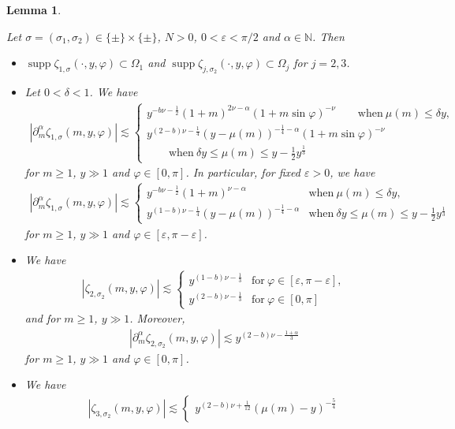 \documentclass[pdftex]{sigma}
\numberwithin{equation}{section}
\newtheorem{Lemma}[Theorem]{Lemma}
\def\d{\,\mathrm{d}}%
\DeclareMathOperator{\supp}{supp}%
\def\a{\alpha}
\def\d{\delta}
\def\e{\varepsilon}
\def\f{\varphi}
\def\m{\mu}
\def\n{\nu}
\def\s{\sigma}
\def\z{\zeta}
\def\pa{\partial}
\begin{document}
\begin{Lemma}\label{ampesti}

Let $\s=(\s_1,\s_2)\in \{\pm\}\times\{\pm\}$, $N>0$, $0<\e<\pi/2$ and $\a\in\mathbb{N}$. Then
\begin{itemize}\itemsep=0pt
\item[$(i)$] $\supp \z_{1,\s}(\cdot,y,\f)\subset \Omega_1$ and $\supp \z_{j,\s_2}(\cdot,y,\f)\subset \Omega_j$ for $j=2,3$.
\item[$(ii)$] Let $0<\d<1$. We have
\begin{align*}
|\pa_{m}^{\a}\z_{1,\s}(m,y,\f)|\lesssim \begin{cases}y^{-b\n-\frac{1}{2}}(1+m)^{2\n-\a}(1+m\sin \f)^{-\n} \qquad \text{when}\  \m(m)\leq \d y, \\
y^{(2-b)\n-\frac{1}{4}} (y-\m(m))^{-\frac{1}{4}-\a}(1+m\sin \f)^{-\n}\\
\qquad\text{when}\  \d y\leq \m(m)\leq y-\frac{1}{2}y^{\frac{1}{3}}
\end{cases}
\end{align*}
for $m\geq 1$, $y\gg 1$ and $\f\in [0,\pi]$. In particular, for fixed $\e>0$, we have
\begin{align*}
|\pa_{m}^{\a}\z_{1,\s}(m,y,\f)|\lesssim \begin{cases}y^{-b\n-\frac{1}{2}}(1+m)^{\n-\a}&  \text{when}\  \m(m)\leq \d y,\\
y^{(1-b)\n-\frac{1}{4}} (y-\m(m))^{-\frac{1}{4}-\a}& \text{when}\  \d y\leq \m(m)\leq y-\frac{1}{2}y^{\frac{1}{3}}
\end{cases}
\end{align*}
for $m\geq 1$, $y\gg 1$ and $\f\in [\e,\pi-\e]$.
\item[$(iii)$] We have
\begin{align*}
|\z_{2,\s_2}(m,y,\f)|\lesssim \begin{cases}y^{(1-b)\n-\frac{1}{3}}& \text{for}\  \f\in [\e,\pi-\e],\\
y^{(2-b)\n-\frac{1}{3}}& \text{for}\  \f\in [0,\pi]
\end{cases}
\end{align*}
and for $m\geq 1$, $y\gg 1$. Moreover,
\begin{align*}
|\pa_{m}^{\a}\z_{2,\s_2}(m,y,\f)|\lesssim y^{(2-b)\n-\frac{1+\a}{3}}
\end{align*}
for $m\geq 1$, $y\gg 1$ and $\f\in [0,\pi]$.
\item[$(iv)$]
We have
\begin{align*}%
|\z_{3,\s_2}(m,y,\f)|\lesssim \begin{cases}y^{(2-b)\n+\frac{1}{12}}(\m(m)-y)^{-\frac{5}{4}}\\

\end{cases}
\end{align*}
\end{itemize}
\end{Lemma}
\end{document}
